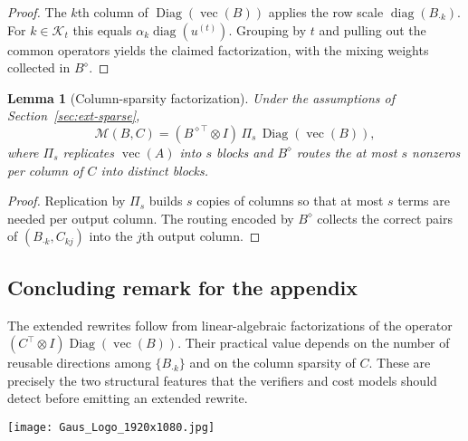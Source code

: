 \documentclass[11pt,a4paper]{article}
\newtheorem{lemma}[theorem]{Lemma}
\theoremstyle{definition}
\newcommand{\diag}{\operatorname{diag}}
\newcommand{\Diag}{\operatorname{Diag}}
\newcommand{\vecop}{\operatorname{vec}}
\begin{document}
\begin{proof}
The $k$th column of $\Diag(\vecop(B))$ applies the row scale $\diag(B_{\cdot k})$. For $k\in\mathcal{K}_t$ this equals $\alpha_k \diag(u^{(t)})$. Grouping by $t$ and pulling out the common operators yields the claimed factorization, with the mixing weights collected in $B^\diamond$.
\end{proof}

\begin{lemma}[Column-sparsity factorization]\label{lem:s-sparse-factor}
Under the assumptions of Section~\ref{sec:ext-sparse},
\[
\mathcal{M}(B,C) = (B^{\diamond\top} \otimes I)\, \Pi_s\, \Diag(\vecop(B)),
\]
where $\Pi_s$ replicates $\vecop(A)$ into $s$ blocks and $B^\diamond$ routes the at most $s$ nonzeros per column of $C$ into distinct blocks.
\end{lemma}

\begin{proof}
Replication by $\Pi_s$ builds $s$ copies of columns so that at most $s$ terms are needed per output column. The routing encoded by $B^\diamond$ collects the correct pairs of $(B_{\cdot k}, C_{k j})$ into the $j$th output column.
\end{proof}

\subsection{Concluding remark for the appendix}
The extended rewrites follow from linear-algebraic factorizations of the operator $(C^\top \otimes I)\Diag(\vecop(B))$. Their practical value depends on the number of reusable directions among $\{B_{\cdot k}\}$ and on the column sparsity of $C$. These are precisely the two structural features that the verifiers and cost models should detect before emitting an extended rewrite.

\vspace{1.5cm}

\begin{flushright}
\texttt{[image: Gaus\_Logo\_1920x1080.jpg]}
\end{flushright}
\end{document}
